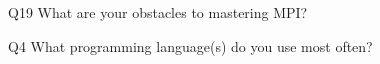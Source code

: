\begin{description}%
\item{Q19} What are your obstacles to mastering MPI?%
\item{Q4} What programming language(s) do you use most often?%
\end{description}%
